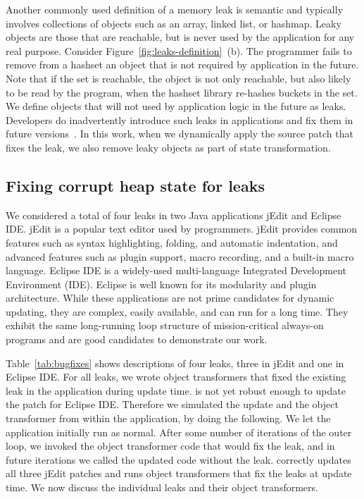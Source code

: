 

Another commonly used definition of a memory leak is semantic and typically
involves collections of objects such as an array, linked list, or hashmap.
Leaky objects are those that are reachable, but is never used by the
application for any real purpose.
Consider
Figure~\ref{fig:leaks-definition}~(b).
The programmer fails to remove from a
hashset an object that is not required by application in the future. Note
that if the set is reachable, the object is not only reachable, but also
likely to be read by the program, when the hashset library re-hashes
buckets in the set.  We define objects that will not used by application
logic in the future as leaks. Developers do inadvertently introduce such
leaks in applications and fix them in future
versions~\cite{leak-pruning,cork}. In this work, when
we dynamically apply the source patch that fixes the leak, we also remove
leaky objects as part of state transformation.

\subsection{Fixing corrupt heap state for leaks}
We considered a total of four leaks in two Java applications jEdit and
Eclipse IDE.  jEdit is a popular text editor used by programmers. jEdit
provides common features such as syntax highlighting, folding, and
automatic indentation, and advanced features such as plugin support, macro
recording, and a built-in macro language. Eclipse IDE is a widely-used
multi-language Integrated Development Environment (IDE). Eclipse is well
known for its modularity and plugin architecture. While these applications
are not prime candidates for dynamic updating, they are complex, easily
available, and can run for a long time. They exhibit the same long-running
loop structure of mission-critical always-on programs and are good
candidates to demonstrate our work.



Table~\ref{tab:bugfixes} shows descriptions of four leaks, three in jEdit
and one in Eclipse IDE. For all leaks, we wrote object transformers that
fixed the existing leak in the application during update time. \JV is not
yet robust enough to update the patch for Eclipse IDE. Therefore we
simulated the update and the object transformer from within the application,
by doing the following. We let the application initially run as normal.
After some number of iterations of the outer loop, we invoked the object
transformer code that would fix the leak, and in future iterations we
called the updated code without the leak. \JV correctly updates all three
jEdit patches and runs object transformers that fix the leaks at update
time.  We now discuss the individual leaks and their object transformers.

